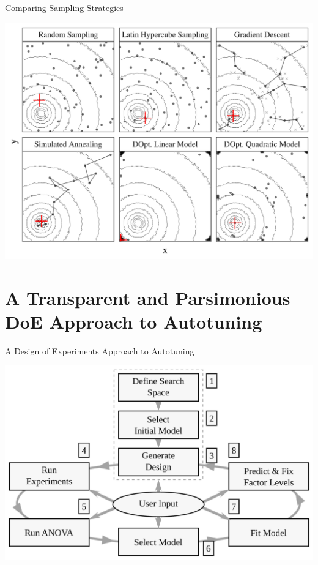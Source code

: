 \documentclass[10pt, compress, aspectratio=169, xcolor={table,usenames,dvipsnames}]{beamer}
\begin{document}
\begin{frame}[label={sec:org63e86e8}]{Comparing Sampling Strategies}
\begin{center}
\begin{center}
\includegraphics[width=.72\textwidth]{../../../img/sampling_comparison.pdf}
\end{center}
\end{center}
\end{frame}
\section{A Transparent and Parsimonious DoE Approach to Autotuning}
\label{sec:org4f72d31}
\begin{frame}[label={sec:orge6c441b}]{A Design of Experiments Approach to Autotuning}
\begin{center}
\begin{center}
\includegraphics[width=.74\linewidth]{../../../img/doe_anova_strategy.pdf}
\end{center}

\vspace{-.2cm}
\end{center}
\end{frame}
\end{document}
